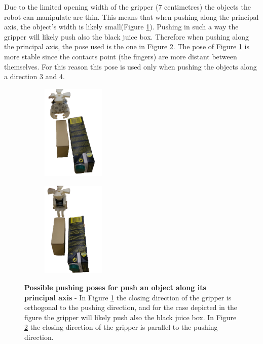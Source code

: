Due to the limited opening width of the gripper (7 centimetres) the objects the robot can manipulate are thin. This means that when pushing along the principal axis, the object's width is likely small(Figure \ref{fig:pushing_way1}). Pushing in such a way the gripper will likely push also the black juice box. Therefore when pushing along the principal axis, the pose used is the one in Figure \ref{fig:pushing_way2}. The pose of Figure \ref{fig:pushing_way1} is more stable since the contacts point (the fingers) are more distant between themselves. For this reason this pose is used only when pushing the objects along a direction 3 and 4.


\begin{figure}[tb]
\centering
\begin{subfigure}[t]{0.45\textwidth}
\centering
\includegraphics[width=3cm]{Img/pushing/pushing333.png}
\caption{}\label{fig:pushing_way1}
\end{subfigure}
\begin{subfigure}[t]{0.45\textwidth}
\centering
\includegraphics[width=3cm]{Img/pushing/pushing222.png}
\caption{}\label{fig:pushing_way2}
\end{subfigure}
\caption{\textbf{Possible pushing poses for push an object along its principal axis} - In Figure \ref{fig:pushing_way1} the closing direction of the gripper is orthogonal to the pushing direction, and for the case depicted in the figure the gripper will likely push also the black juice box. In Figure \ref{fig:pushing_way2} the closing direction of the gripper is parallel to the pushing direction.}\label{fig:pushing_way}
\end{figure}

